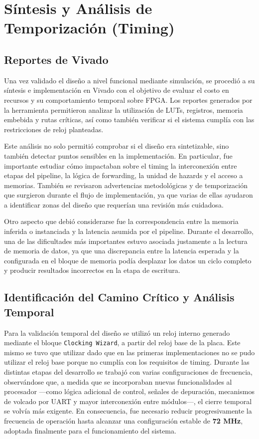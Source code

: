 \newpage

\section{Síntesis y Análisis de Temporización (Timing)}

\subsection{Reportes de Vivado}
Una vez validado el diseño a nivel funcional mediante simulación, se procedió a su síntesis e implementación en Vivado con el objetivo de evaluar el costo en recursos y su comportamiento temporal sobre FPGA. Los reportes generados por la herramienta permitieron analizar la utilización de LUTs, registros, memoria embebida y rutas críticas, así como también verificar si el sistema cumplía con las restricciones de reloj planteadas.

Este análisis no solo permitió comprobar si el diseño era sintetizable, sino también detectar puntos sensibles en la implementación. En particular, fue importante estudiar cómo impactaban sobre el timing la interconexión entre etapas del pipeline, la lógica de forwarding, la unidad de hazards y el acceso a memorias. También se revisaron advertencias metodológicas y de temporización que surgieron durante el flujo de implementación, ya que varias de ellas ayudaron a identificar zonas del diseño que requerían una revisión más cuidadosa.

Otro aspecto que debió considerarse fue la correspondencia entre la memoria inferida o instanciada y la latencia asumida por el pipeline. Durante el desarrollo, una de las dificultades más importantes estuvo asociada justamente a la lectura de memoria de datos, ya que una discrepancia entre la latencia esperada y la configurada en el bloque de memoria podía desplazar los datos un ciclo completo y producir resultados incorrectos en la etapa de escritura.



\subsection{Identificación del Camino Crítico y Análisis Temporal}

Para la validación temporal del diseño se utilizó un reloj interno generado mediante el bloque \texttt{Clocking Wizard}, a partir del reloj base de la placa. Este mismo se tuvo que utilizar dado que en las primeras implementaciones no se pudo utilizar el reloj base porque no cumplía con los requisitos de timing. Durante las distintas etapas del desarrollo se trabajó con varias configuraciones de frecuencia, observándose que, a medida que se incorporaban nuevas funcionalidades al procesador ---como lógica adicional de control, señales de depuración, mecanismos de volcado por UART y mayor interconexión entre módulos---, el cierre temporal se volvía más exigente. En consecuencia, fue necesario reducir progresivamente la frecuencia de operación hasta alcanzar una configuración estable de \textbf{72 MHz}, adoptada finalmente para el funcionamiento del sistema.

